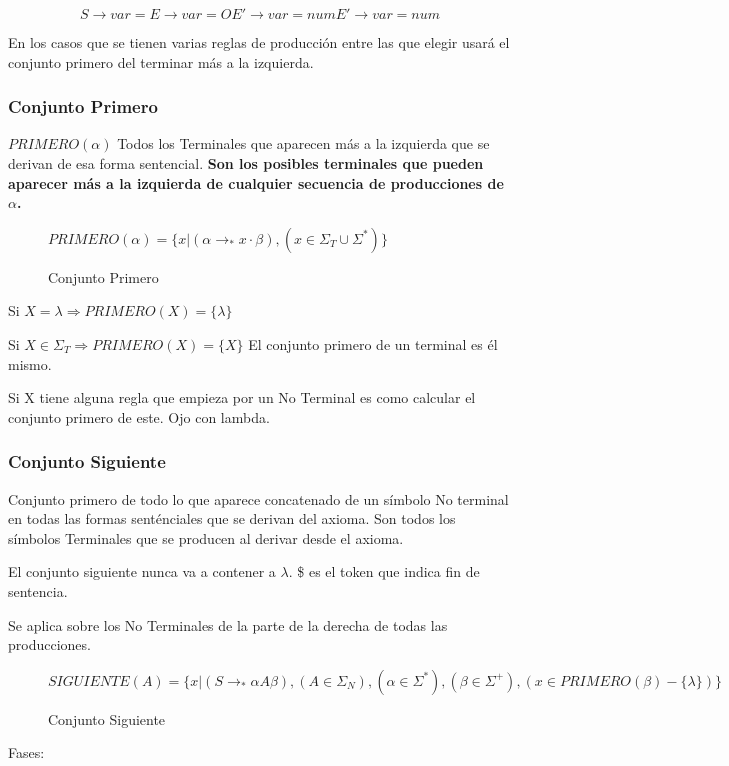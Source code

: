 \documentclass[12pt, twoside, openright]{report} %
\begin{document}
\begin{multicols}{2}
\end{multicols}

$$S \rightarrow var = E \rightarrow var = O E'\rightarrow var = num E' \rightarrow var = num$$


En los casos que se tienen varias reglas de producción entre las que
elegir usará el conjunto primero del terminar más a la izquierda.


\subsubsection{Conjunto Primero}

\(PRIMERO(\alpha)\) Todos los Terminales que aparecen más a la izquierda
que se derivan de esa forma sentencial. \textbf{Son los posibles
terminales que pueden aparecer más a la izquierda de cualquier secuencia
de producciones de \(\alpha\).} 
\begin{figure}[H]
  $PRIMERO(\alpha)=\{ x | (\alpha \rightarrow _* x \cdot \beta), (x \in \Sigma_T \cup \Sigma^*)\}$

  \captionsetup{justification=centering}
  \caption{Conjunto Primero}
\end{figure}
Si \(X=\lambda \Rightarrow PRIMERO(X)=\{\lambda\}\)

Si \(X \in \Sigma_T \Rightarrow PRIMERO(X)=\{X\}\) El conjunto primero
de un terminal es él mismo.

Si X tiene alguna regla que empieza por un No Terminal es como calcular
el conjunto primero de este. Ojo con lambda.


\subsubsection{Conjunto Siguiente}

Conjunto primero de todo lo que aparece concatenado de un símbolo No
terminal en todas las formas senténciales que se derivan del axioma. Son
todos los símbolos Terminales que se producen al derivar desde el
axioma.

El conjunto siguiente nunca va a contener a \(\lambda\). \$ es el token
que indica fin de sentencia.

Se aplica sobre los No Terminales de la parte de la derecha de todas las
producciones. 
\begin{figure}[H]
  $SIGUIENTE(A)=\{ x | (S \rightarrow _*\alpha A \beta), (A \in \Sigma_N), (\alpha \in \Sigma^*), (\beta \in \Sigma^+),(x\in PRIMERO(\beta)-\{\lambda\})\}$

  \captionsetup{justification=centering}
  \caption{Conjunto Siguiente}
\end{figure}
Fases:
\end{document}
